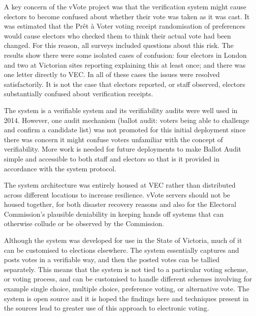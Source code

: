 \documentclass[twocolumn]{article}
\begin{document}
A key concern of the vVote project was that the verification system might cause electors to become confused about whether their vote was taken as it was cast.  It was estimated that the Pr\^et \`a Voter voting receipt randomisation of preferences would cause electors who checked them to think their actual vote had been changed.  For this reason, all surveys included questions about this risk.  The results show there were some isolated cases of confusion: four electors in London and two at Victorian sites reporting explaining this at least once; and there was one letter directly to VEC.  In all of these cases the issues were resolved satisfactorily.  It is not the case that electors reported, or staff observed, electors substantially confused about verification receipts.

The system is a verifiable system and its verifiability audits were well used in 2014.  However, one audit mechanism (ballot audit: voters being able to challenge and confirm a candidate list) was not promoted for this initial deployment since there was concern it might confuse voters unfamiliar with the concept of verifiability.  More work is needed for future deployments to make Ballot Audit simple and accessible to both staff and electors so that is it provided in accordance with the system protocol.  

The system architecture was entirely housed at VEC rather than distributed across different locations to increase resilience.  vVote servers should not be housed together, for both disaster recovery reasons and also for the Electoral Commission's plausible deniability in keeping hands off systems that can otherwise collude or be observed by the Commission.  








Although the system was developed for use in the State of Victoria, much of it can be customised to elections elsewhere.  The system essentially captures and posts votes in a verifiable way, and then the posted votes can be tallied separately.  This means that the system is not tied to a particular voting scheme, or voting process, and can be customised to handle different schemes involving for example single choice, multiple choice, preference voting, or alternative vote.  The system is open source and it is hoped the findings here and techniques present in the sources lead to greater use of this approach to electronic voting.
\end{document}
